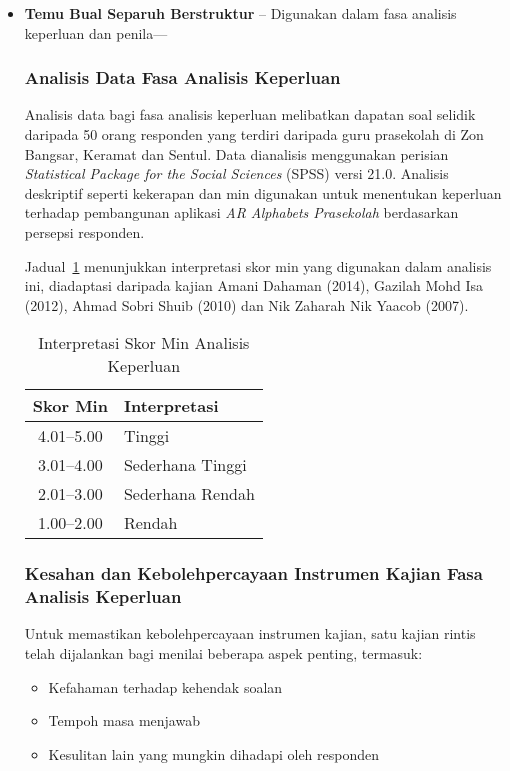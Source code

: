 \begin{itemize}
  \item \textbf{Temu Bual Separuh Berstruktur} – Digunakan dalam fasa analisis keperluan dan penila—
  \subsubsection{Analisis Data Fasa Analisis Keperluan}

Analisis data bagi fasa analisis keperluan melibatkan dapatan soal selidik daripada 50 orang responden yang terdiri daripada guru prasekolah di Zon Bangsar, Keramat dan Sentul. Data dianalisis menggunakan perisian \textit{Statistical Package for the Social Sciences} (SPSS) versi 21.0. Analisis deskriptif seperti kekerapan dan min digunakan untuk menentukan keperluan terhadap pembangunan aplikasi \textit{AR Alphabets Prasekolah} berdasarkan persepsi responden.

Jadual~\ref{jadual:interpretasiMin} menunjukkan interpretasi skor min yang digunakan dalam analisis ini, diadaptasi daripada kajian Amani Dahaman (2014), Gazilah Mohd Isa (2012), Ahmad Sobri Shuib (2010) dan Nik Zaharah Nik Yaacob (2007).

\begin{table}[H]
\centering
\caption{Interpretasi Skor Min Analisis Keperluan}
\label{jadual:interpretasiMin}
\begin{tabular}{|c|l|}
\hline
\textbf{Skor Min} & \textbf{Interpretasi} \\
\hline
4.01–5.00 & Tinggi \\
3.01–4.00 & Sederhana Tinggi \\
2.01–3.00 & Sederhana Rendah \\
1.00–2.00 & Rendah \\
\hline
\end{tabular}
\end{table}

\subsubsection{Kesahan dan Kebolehpercayaan Instrumen Kajian Fasa Analisis Keperluan}

Untuk memastikan kebolehpercayaan instrumen kajian, satu kajian rintis telah dijalankan bagi menilai beberapa aspek penting, termasuk:

\begin{itemize}
  \item Kefahaman terhadap kehendak soalan
  \item Tempoh masa menjawab
  \item Kesulitan lain yang mungkin dihadapi oleh responden
\end{itemize}


\end{itemize}

